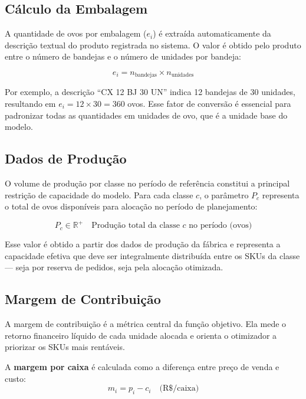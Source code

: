 \documentclass[11pt,a4paper]{article}
\begin{document}
\subsection{Cálculo da Embalagem}

A quantidade de ovos por embalagem ($e_i$) é extraída automaticamente da
descrição textual do produto registrada no sistema. O valor é obtido pelo
produto entre o número de bandejas e o número de unidades por bandeja:

\begin{equation}\label{eq:auto:001}
e_i = n_{\text{bandejas}} \times n_{\text{unidades}}
\end{equation}

Por exemplo, a descrição ``CX 12 BJ 30 UN'' indica 12 bandejas de 30 unidades,
resultando em $e_i = 12 \times 30 = 360$ ovos. Esse fator de conversão é
essencial para padronizar todas as quantidades em unidades de ovo, que é a
unidade base do modelo.

\subsection{Dados de Produção}

O volume de produção por classe no período de referência constitui a principal restrição de
capacidade do modelo. Para cada classe $c$, o parâmetro $P_c$ representa o
total de ovos disponíveis para alocação no período de planejamento:

\begin{equation}\label{eq:auto:002}
P_c \in \mathbb{R}^+ \quad \text{Produção total da classe } c \text{ no período (ovos)}
\end{equation}

Esse valor é obtido a partir dos dados de produção da fábrica e representa a
capacidade efetiva que deve ser integralmente distribuída entre os SKUs da
classe --- seja por reserva de pedidos, seja pela alocação otimizada.

\subsection{Margem de Contribuição}

A margem de contribuição é a métrica central da função objetivo. Ela mede o
retorno financeiro líquido de cada unidade alocada e orienta o otimizador a
priorizar os SKUs mais rentáveis.

A \textbf{margem por caixa} é calculada como a diferença entre preço de venda e
custo:
\begin{equation}\label{eq:auto:003}
m_i = p_i - c_i \quad \text{(R\$/caixa)}
\end{equation}
\end{document}
